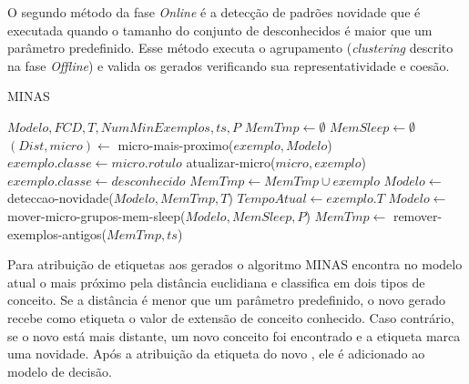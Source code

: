 O segundo método da fase \emph{Online} é a detecção de padrões novidade
que é executada quando o tamanho do conjunto de desconhecidos é maior
que um parâmetro predefinido.
Esse método executa o agrupamento (\emph{clustering} descrito na fase
\emph{Offline}) e valida os \mclusters gerados verificando sua representatividade
e coesão.

\begin{algorithm}[ht]
  \caption{MINAS \cite{Faria2016minas,Cassales2019a}}
  \label{alg:MINAS}
  \renewcommand{\algorithmicrequire}{\textbf{Entrada:}}
  \begin{algorithmic}[1]
    \REQUIRE $Modelo,FCD,T,NumMinExemplos,ts,P$
    \STATE $MemTmp \leftarrow \emptyset$
    \STATE $MemSleep \leftarrow \emptyset$
    \STATE $(Dist,micro) \leftarrow$ micro-mais-proximo($exemplo,Modelo$)
    \STATE $exemplo.classe \leftarrow micro.rotulo$
    \STATE atualizar-micro($micro,exemplo$)
    \ELSE
    \STATE $exemplo.classe \leftarrow desconhecido$
    \STATE $MemTmp \leftarrow MemTmp \cup exemplo$
    \STATE $Modelo \leftarrow $ deteccao-novidade($Modelo,MemTmp,T$)
    \ENDIF
    \ENDIF
    \STATE $TempoAtual \leftarrow exemplo.T$
    \STATE $Modelo \leftarrow$ mover-micro-grupos-mem-sleep($Modelo,MemSleep,P$)
    \STATE $MemTmp \leftarrow$ remover-exemplos-antigos($MemTmp,ts$)
    \ENDIF
    \ENDFOR
  \end{algorithmic}
\end{algorithm}

Para atribuição de etiquetas aos \mclusters gerados o algoritmo MINAS
encontra no modelo atual o \mcluster mais próximo pela distância
euclidiana e classifica em dois tipos de conceito.
Se a distância é menor que um parâmetro predefinido,
o novo \mcluster gerado recebe como etiqueta o valor de extensão
de conceito conhecido.
Caso contrário, se o novo \mcluster está mais distante,
um novo conceito foi encontrado e a etiqueta marca uma novidade.
Após a atribuição da etiqueta do novo \mcluster, ele é adicionado
ao modelo de decisão.


